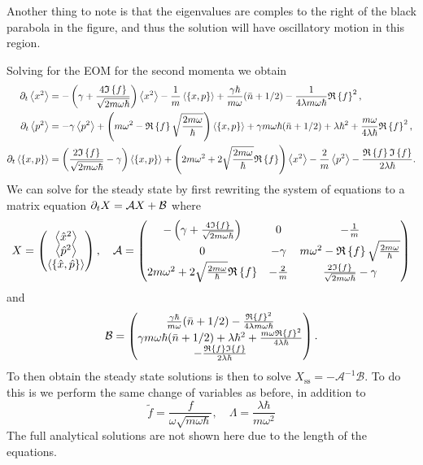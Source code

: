 Another thing to note is that the eigenvalues are comples to the right of the black parabola in the figure, and thus the solution will have oscillatory motion in this region.

Solving for the EOM for the second momenta we obtain
\begin{align}
    \dt \expval{x^2} &= -\left(\gamma + \frac{4\im{f}}{\sqrt{2 m \omega \hbar}}\right) \expval{x^2} - \frac{1}{m} \expval{\acomm{x}{p}} + \frac{\gamma \hbar}{m \omega} (\nbar + 1/2) - \frac{1}{4\lambda m \omega \hbar} \re{f}^2,\\
    \dt \expval{p^2} &=  -\gamma \expval{p^2} + \left( m\omega^2 - \re{f} \sqrt{\frac{2m \omega}{\hbar}} \right)\expval{\acomm{x}{p}} + \gamma m \omega \hbar (\nbar + 1/2) + \lambda \hbar^2 + \frac{m \omega}{4 \lambda \hbar}\re{f}^2 ,\\
    \dt \expval{\acomm{x}{p}} &= \left(\frac{2\im{f}}{\sqrt{2m \omega \hbar}} - \gamma  \right)\expval{\acomm{x}{p}} + \left(2 m \omega^2 + 2 \sqrt{\frac{2 m \omega}{\hbar}}\re{f} \right) \expval{x^2} - \frac{2}{m} \expval{p^2} - \frac{\re{f} \im{f}}{2 \lambda \hbar}.
\end{align}
We can solve for the steady state by first rewriting the system of equations to a matrix equation $\partial_t X = \mathcal{A} X + \mathcal{B}$ where
\begin{equation}
    X =
    \begin{pmatrix}
        \expval{\xop^2}\\
        \expval{\pop^2}\\
        \expval{\acomm{\xop}{\pop}}    
    \end{pmatrix}, \quad
    \mathcal{A} = \begin{pmatrix}
        -\left(\gamma + \frac{4\im{f}}{\sqrt{2 m \omega \hbar}}\right) & 0 & -\frac{1}{m} \\
        0 & -\gamma & m\omega^2 - \re{f} \sqrt{\frac{2m \omega}{\hbar}} \\
        2 m \omega^2 + 2 \sqrt{\frac{2 m \omega}{\hbar}}\re{f} & -\frac{2}{m} & \frac{2\im{f}}{\sqrt{2m \omega \hbar}} - \gamma \label{eq:matrixA}
    \end{pmatrix}
\end{equation}
and
\begin{equation}
    \mathcal{B} = 
    \begin{pmatrix}
        \frac{\gamma \hbar}{m \omega} (\bar{n} + 1/2) - \frac{\mathfrak{R}\left\{f\right\}^2}{4\lambda m \omega \hbar}\\
        \gamma m \omega \hbar (\bar{n} + 1/2) + \lambda \hbar^2 +\frac{m \omega \mathfrak{R}\left\{f\right\}^2}{4 \lambda \hbar}\\
        -\frac{\mathfrak{R}\left\{f\right\} \mathfrak{I}\left\{f\right\}}{2 \lambda \hbar}
    \end{pmatrix}.
\end{equation}
To then obtain the steady state solutions is then to solve $X_\text{ss} = - \mathcal{A}^{-1} \mathcal{B}$. To do this is we perform the same change of variables as before, in addition to
\begin{equation}
    \tilde{f} = \frac{f}{\omega \sqrt{m \omega \hbar}} , \quad \Lambda = \frac{\lambda \hbar}{m \omega^2}
\end{equation}
The full analytical solutions are not shown here due to the length of the equations.

